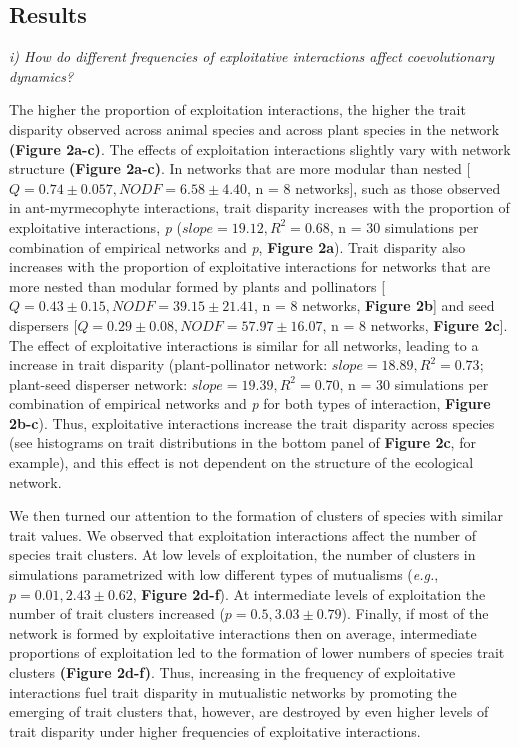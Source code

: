 \documentclass[a4paper, 12pt]{article}
\begin{document}
\subsection*{Results}
\textit{i) How do different frequencies of exploitative interactions affect  coevolutionary dynamics?}

The higher the proportion of exploitation interactions, the higher the trait disparity observed across animal species and across plant species in the network \textbf{(Figure 2a-c)}. The effects of exploitation interactions slightly vary with network structure \textbf{(Figure 2a-c)}. In networks that are more modular than nested [$Q = 0.74 \pm 0.057, NODF = 6.58 \pm 4.40$, n = 8 networks], such as those observed in ant-myrmecophyte interactions, trait disparity increases with the proportion of exploitative interactions, \textit{p} ($slope = 19.12, R^{2} = 0.68$, n = 30 simulations per combination of empirical networks and \textit{p}, \textbf{Figure 2a}). Trait disparity also increases with the proportion of exploitative interactions for networks that are more nested than modular formed by plants and pollinators [$Q = 0.43 \pm 0.15, NODF = 39.15 \pm 21.41$, n = 8 networks, \textbf{Figure 2b}] and seed dispersers [$Q = 0.29 \pm 0.08, NODF = 57.97 \pm 16.07$, n = 8 networks, \textbf{Figure 2c}]. The effect of exploitative interactions is similar for all networks, leading to a increase in trait disparity (plant-pollinator network: $slope = 18.89, R^{2} = 0.73$; plant-seed disperser network: $slope = 19.39, R^{2} = 0.70$, n = 30 simulations per combination of empirical networks and \textit{p} for both types of interaction, \textbf{Figure 2b-c}). Thus, exploitative interactions increase the trait disparity across species (see histograms on trait distributions in the bottom panel of \textbf{Figure 2c}, for example), and this effect is not dependent on the structure of the ecological network. 

We then turned our attention to the formation of clusters of species with similar trait values. We observed that exploitation interactions affect the number of species trait clusters. At low levels of exploitation, the number of clusters in simulations parametrized with low different types of mutualisms (\textit{e.g.}, $p = 0.01, 2.43 \pm 0.62$, \textbf{Figure 2d-f}). At intermediate levels of exploitation the number of trait clusters increased ($p = 0.5, 3.03 \pm 0.79$). Finally, if most of the network is formed by exploitative interactions then on average, intermediate proportions of exploitation led to the formation of lower numbers of species trait clusters \textbf{(Figure 2d-f)}.  Thus, increasing in the frequency of exploitative interactions fuel trait disparity in mutualistic networks by promoting the emerging of trait clusters that, however, are destroyed by even higher levels of trait disparity under higher frequencies of exploitative interactions.
\end{document}
